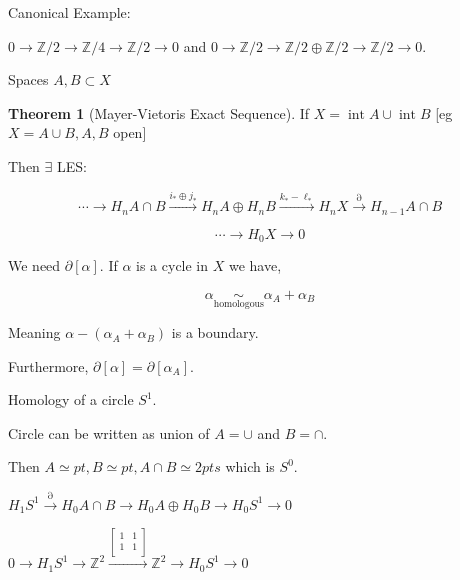 \documentclass{article}
\theoremstyle{definition}
\newtheorem{theorem}{Theorem}
\begin{document}
    Canonical Example:

    \(0 \to \mathbb{Z} / 2 \to \mathbb{Z} / 4 \to \mathbb{Z} /2 \to 0\) and \(0 \to \mathbb{Z} /2 \to \mathbb{Z} / 2 \oplus \mathbb{Z} /2 \to \mathbb{Z} /2 \to 0\).

    Spaces \(A,B \subset X\)

    \begin{center}
    \end{center}
    
    \begin{theorem}
        [Mayer-Vietoris Exact Sequence]

        If \(X = \operatorname{int} A \cup \operatorname{int} B\) [eg \(X = A\cup B, A, B\) open]

        Then \(\exists\) LES:

        \[
            \cdots \to H_n A \cap B \xrightarrow{i_{\ast} \oplus j_{\ast}} H_n A \oplus H_n B \xrightarrow{k_{\ast} - \ell_{\ast}} H_n X \xrightarrow{\partial} H_{n-1} A \cap B
        \]

        \[
            \cdots \to H_0 X \to 0
        \]
    \end{theorem}

    We need \(\partial [\alpha]\). If \(\alpha\) is a cycle in \(X\) we have,

    \[
        \alpha \underset{\text{homologous}}{\sim} \alpha_A + \alpha_B
    \]

    Meaning \(\alpha - (\alpha_A + \alpha_B)\) is a boundary.

    Furthermore, \(\partial [\alpha] = \partial [\alpha_A]\).

    Homology of a circle \(S^1\).

    Circle can be written as union of \(A = \cup\) and \( B = \cap\).

    Then \(A \simeq pt, B \simeq pt, A\cap B \simeq 2 pts\) which is \(S^0\).

    \(H_1 S^1 \xrightarrow{\partial} H_0 A \cap B \to H_0 A \oplus  H_0 B \to H_0 S^1 \to 0\) 

    \(0 \to H_1 S^1 \to \mathbb{Z}^2 \xrightarrow{\begin{bmatrix}
        1 & 1 \\
        1 & 1 \\
    \end{bmatrix}} \mathbb{Z}^2 \to H_0 S^1 \to 0\)
    
\end{document}

